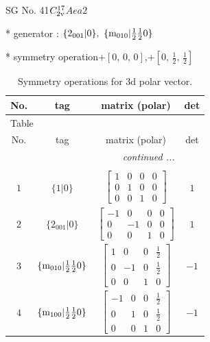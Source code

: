 \documentclass[fleqn,8pt]{jsarticle}
\begin{document}
\setcounter{MaxMatrixCols}{32}

\renewcommand{\tablename}{Table~}
\renewcommand{\figurename}{Figure~}
\begin{center}
\LARGE
SG No. 41\quad$C_{\rm 2v}^{17}$\quad$Aea2$\quad[ orthorhombic ]
\end{center}

* generator : $\{2{}_{001}|0\},\,\,\{{\rm m}_{010}|\frac{1}{2} \frac{1}{2} 0\}$

* symmetry operation\quad$+\left[ 0,\, 0,\, 0 \right]$,\quad $+\left[ 0,\, \frac{1}{2},\, \frac{1}{2} \right]$
\renewcommand{\arraystretch}{1.3}
\begin{longtable}{cccc}
\caption{Symmetry operations for 3d polar vector.}
 \\
 \hline \hline
No. & tag & matrix (polar) & det \\ \hline \endfirsthead

\multicolumn{3}{l}{\tablename\ \thetable{}} \\
 \hline \hline
No. & tag & matrix (polar) & det \\ \hline \endhead

 \hline \hline
\multicolumn{3}{r}{\footnotesize\it continued ...} \\ \endfoot

 \hline \hline
\multicolumn{3}{r}{} \\ \endlastfoot

$ 1 $ & $ \{1|0\} $ & $ \begin{bmatrix} 1 & 0 & 0 & 0 \\ 0 & 1 & 0 & 0 \\ 0 & 0 & 1 & 0 \end{bmatrix} $ & $ 1 $ \\ \hline
$ 2 $ & $ \{2{}_{001}|0\} $ & $ \begin{bmatrix} -1 & 0 & 0 & 0 \\ 0 & -1 & 0 & 0 \\ 0 & 0 & 1 & 0 \end{bmatrix} $ & $ 1 $ \\ \hline
$ 3 $ & $ \{{\rm m}_{010}|\frac{1}{2} \frac{1}{2} 0\} $ & $ \begin{bmatrix} 1 & 0 & 0 & \frac{1}{2} \\ 0 & -1 & 0 & \frac{1}{2} \\ 0 & 0 & 1 & 0 \end{bmatrix} $ & $ -1 $ \\ \hline
$ 4 $ & $ \{{\rm m}_{100}|\frac{1}{2} \frac{1}{2} 0\} $ & $ \begin{bmatrix} -1 & 0 & 0 & \frac{1}{2} \\ 0 & 1 & 0 & \frac{1}{2} \\ 0 & 0 & 1 & 0 \end{bmatrix} $ & $ -1 $ \\
\end{longtable}
\end{document}
